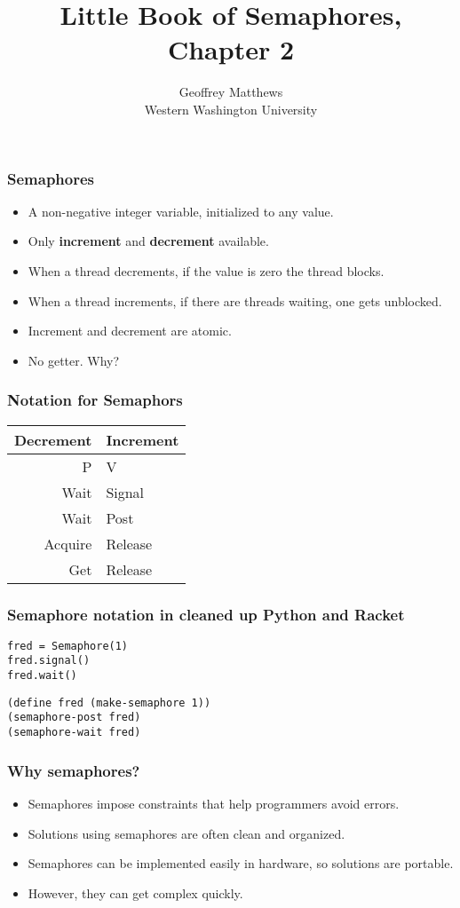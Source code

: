 \documentclass{beamer}
\title{Little Book of Semaphores, Chapter 2}
\author{Geoffrey Matthews\\
\small Western Washington University}
\newcommand{\bi}{\begin{itemize}}
\newcommand{\ii}{\item}
\newcommand{\ei}{\end{itemize}}
\newcommand{\bfr}[1]{\begin{frame}[fragile]\frametitle{{ #1 }}}
\begin{document}
\maketitle

\bfr{Semaphores}
\bi
\ii A non-negative integer variable, initialized to any value.
\ii Only {\bf increment} and {\bf decrement} available.
\ii When a thread decrements, if the value is zero the thread blocks.
\ii When a thread increments, if there are threads waiting, one gets unblocked.
\pause
\ii Increment and decrement are atomic.
\pause
\ii No getter.  Why?
\ei
\end{frame}

\bfr{Notation for Semaphors}

\begin{center}
\begin{tabular}{r|l}
 Decrement & Increment\\\hline
 P & V\\
 Wait & Signal\\
 Wait & Post\\
 Acquire & Release\\
 Get & Release
\end{tabular}
\end{center}

\end{frame}


\bfr{Semaphore notation in cleaned up Python and Racket}


\begin{Verbatim}
fred = Semaphore(1)
fred.signal()
fred.wait()
\end{Verbatim}

\begin{Verbatim}
(define fred (make-semaphore 1))
(semaphore-post fred)
(semaphore-wait fred)
\end{Verbatim}


\end{frame}
\bfr{Why semaphores?}
\bi
\ii Semaphores impose constraints that help programmers avoid errors.
\ii Solutions using semaphores are often clean and organized.
\ii Semaphores can be implemented easily in hardware, so solutions are
portable.  \pause
\ii However, they can get complex quickly.
\ei
\end{frame}
\end{document}
